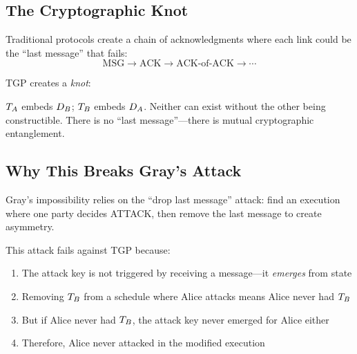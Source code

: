 \subsection{The Cryptographic Knot}

Traditional protocols create a chain of acknowledgments where each link could be the ``last message'' that fails:
\[
\text{MSG} \rightarrow \text{ACK} \rightarrow \text{ACK-of-ACK} \rightarrow \cdots
\]

TGP creates a \emph{knot}:
\begin{center}
\end{center}

$T_{A}$ embeds $D_{B}$; $T_{B}$ embeds $D_{A}$. Neither can exist without the other being constructible. There is no ``last message''---there is mutual cryptographic entanglement.

\subsection{Why This Breaks Gray's Attack}

Gray's impossibility relies on the ``drop last message'' attack: find an execution where one party decides ATTACK, then remove the last message to create asymmetry.

This attack fails against TGP because:

\begin{enumerate}
    \item The attack key is not triggered by receiving a message---it \emph{emerges} from state
    \item Removing $T_{B}$ from a schedule where Alice attacks means Alice never had $T_{B}$
    \item But if Alice never had $T_{B}$, the attack key never emerged for Alice either
    \item Therefore, Alice never attacked in the modified execution
\end{enumerate}

